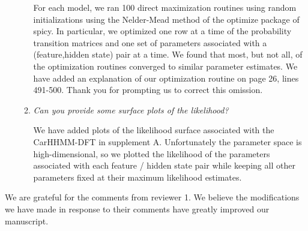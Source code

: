 \documentclass{article}
\begin{document}
\begin{enumerate}
\begin{enumerate}
        For each model, we ran 100 direct maximization routines using random initializations using the Nelder-Mead method of the optimize package of spicy. In particular, we optimized one row at a time of the probability transition matrices and one set of parameters associated with a (feature,hidden state) pair at a time. We found that most, but not all, of the optimization routines converged to similar parameter estimates. We have added an explanation of our optimization routine on page 26, lines 491-500. Thank you for prompting us to correct this omission.
        
        \item \textit{Can you provide some surface plots of the likelihood?} 
        
        We have added plots of the likelihood surface associated with the CarHHMM-DFT in supplement A. Unfortunately the parameter space is high-dimensional, so we plotted the likelihood of the parameters associated with each feature / hidden state pair while keeping all other parameters fixed at their maximum likelihood estimates.
        
    \end{enumerate}

\end{enumerate}

We are grateful for the comments from reviewer 1. We believe the modifications we have made in response to their comments have greatly improved our manuscript.
\end{document}
